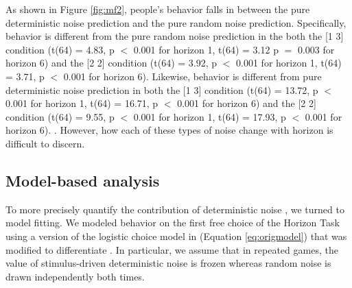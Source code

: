 \documentclass[12pt]{article}
\begin{document}
{As shown in Figure \ref{fig:mf2}, people's behavior falls in between the pure deterministic noise prediction and the pure random noise prediction. Specifically, behavior is different from the pure random noise prediction in the both the [1 3] condition (t(64) = 4.83, p $<$ 0.001 for horizon 1, t(64) = 3.12 p $=$ 0.003 for horizon 6) and the [2 2] condition (t(64) = 3.92, p $<$ 0.001 for horizon 1, t(64) = 3.71, p $<$ 0.001 for horizon 6). Likewise, behavior is different from pure deterministic noise prediction in both the [1 3] condition (t(64) = 13.72, p $<$ 0.001 for horizon 1, t(64) = 16.71, p $<$ 0.001 for horizon 6) and the [2 2] condition (t(64) = 9.55, p $<$ 0.001 for horizon 1, t(64) = 17.93, p $<$ 0.001 for horizon 6).  . However,  how each of these types of noise change with horizon is difficult to discern.

\subsection*{Model-based analysis }

To more precisely quantify the contribution of deterministic noise , we turned to model fitting. We modeled behavior on the first free choice of the Horizon Task using a version of the logistic choice model in \citep{wilson2014} (Equation \ref{eq:origmodel}) that was modified to differentiate . In particular, we assume that in repeated games, the value of stimulus-driven deterministic noise is frozen whereas random noise is drawn independently both times. 

}
\end{document}
